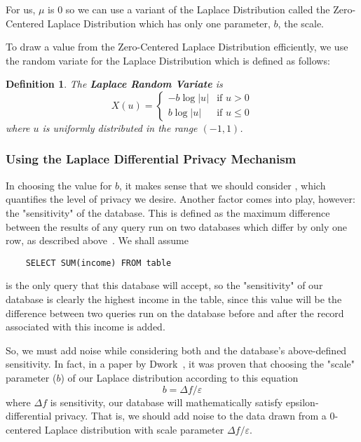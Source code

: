 \documentclass[conference,11pt]{IEEEtran}
\newtheorem{definition}{Definition}
\begin{document}
For us, $\mu$ is 0 so we can use a variant of the Laplace Distribution called
the Zero-Centered Laplace Distribution which has only one parameter, $b$, the
scale.

To draw a value from the Zero-Centered Laplace Distribution efficiently, we use
the random variate for the Laplace Distribution which is defined as follows:
\begin{mdframed}
    \begin{definition}\label{def:laplace-variate}
        The \textbf{Laplace Random Variate} is
        \begin{equation}
            X(u) = \left\{\begin{matrix}
                    -b \log|u| & \text{if }u > 0
                    \\[8pt]
                    b \log|u| & \text{if }u \leq 0
            \end{matrix}\right.
        \end{equation}
        where $u$ is uniformly distributed in the range $(-1, 1)$.
    \end{definition}
\end{mdframed}

\subsubsection{Using the Laplace Differential Privacy Mechanism}\label{sec:using-laplace-dp}
In choosing the value for $b$, it makes sense that we should consider
\textepsilon, which quantifies the level of privacy we desire. Another factor
comes into play, however: the "sensitivity" of the database. This is defined as
the maximum difference between the results of any query run on two databases
which differ by only one row, as described above~\cite{Atockar:2014}. We shall
assume

\begin{verbatim}
    SELECT SUM(income) FROM table
\end{verbatim}
is the only query that this database will accept, so the "sensitivity" of our
database is clearly the highest income in the table, since this value will be
the difference between two queries run on the database before and after the
record associated with this income is added.

So, we must add noise while considering both {\textepsilon} and the database's
above-defined sensitivity. In fact, in a paper by
Dwork~\cite{Dwork:2011:private-data-analysis}, it was proven that choosing the
"scale" parameter ($b$) of our Laplace distribution according to this equation
\begin{equation}
    b = {\Delta}f/\varepsilon
\end{equation}
where ${\Delta}f$ is sensitivity, our database will mathematically satisfy
epsilon-differential privacy. That is, we should add noise to the data drawn
from a 0-centered Laplace distribution with scale parameter
${\Delta}f/\varepsilon$.
\end{document}
